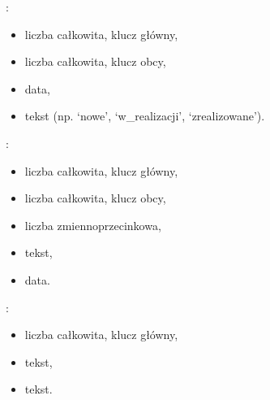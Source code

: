 \documentclass[letterpaper,10pt,english]{sphinxmanual}
\begin{document}
\sphinxAtStartPar
{}:
\begin{itemize}
\item {} 
\sphinxAtStartPar
{} \textendash{} liczba całkowita, klucz główny,

\item {} 
\sphinxAtStartPar
{} \textendash{} liczba całkowita, klucz obcy,

\item {} 
\sphinxAtStartPar
{} \textendash{} data,

\item {} 
\sphinxAtStartPar
{} \textendash{} tekst (np. ‘nowe’, ‘w\_realizacji’, ‘zrealizowane’).

\end{itemize}

\sphinxAtStartPar
{}:
\begin{itemize}
\item {} 
\sphinxAtStartPar
{} \textendash{} liczba całkowita, klucz główny,

\item {} 
\sphinxAtStartPar
{} \textendash{} liczba całkowita, klucz obcy,

\item {} 
\sphinxAtStartPar
{} \textendash{} liczba zmiennoprzecinkowa,

\item {} 
\sphinxAtStartPar
{} \textendash{} tekst,

\item {} 
\sphinxAtStartPar
{} \textendash{} data.

\end{itemize}

\sphinxAtStartPar
{}:
\begin{itemize}
\item {} 
\sphinxAtStartPar
{} \textendash{} liczba całkowita, klucz główny,

\item {} 
\sphinxAtStartPar
{} \textendash{} tekst,

\item {} 
\sphinxAtStartPar
{} \textendash{} tekst.

\end{itemize}
\end{document}
